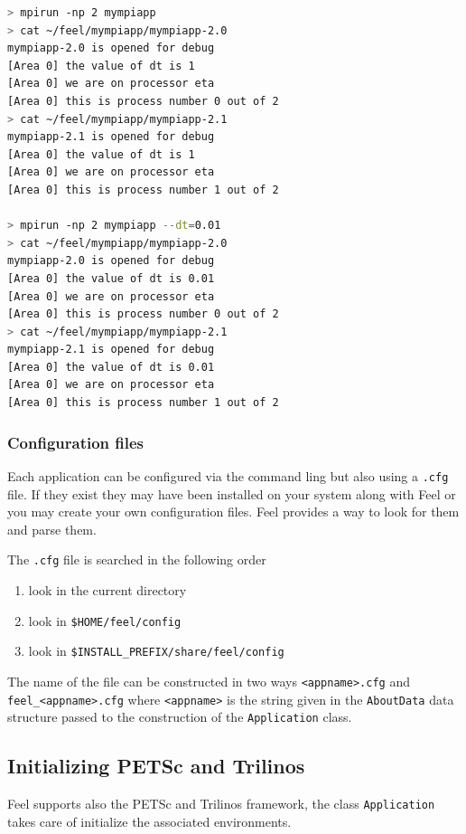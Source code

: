 \documentclass[a4paper]{book}
\newcommand{\feel}{Feel\xspace}
\begin{document}
\begin{lstlisting}[language=sh]
> mpirun -np 2 mympiapp
> cat ~/feel/mympiapp/mympiapp-2.0
mympiapp-2.0 is opened for debug
[Area 0] the value of dt is 1
[Area 0] we are on processor eta
[Area 0] this is process number 0 out of 2
> cat ~/feel/mympiapp/mympiapp-2.1
mympiapp-2.1 is opened for debug
[Area 0] the value of dt is 1
[Area 0] we are on processor eta
[Area 0] this is process number 1 out of 2

> mpirun -np 2 mympiapp --dt=0.01
> cat ~/feel/mympiapp/mympiapp-2.0
mympiapp-2.0 is opened for debug
[Area 0] the value of dt is 0.01
[Area 0] we are on processor eta
[Area 0] this is process number 0 out of 2
> cat ~/feel/mympiapp/mympiapp-2.1
mympiapp-2.1 is opened for debug
[Area 0] the value of dt is 0.01
[Area 0] we are on processor eta
[Area 0] this is process number 1 out of 2
\end{lstlisting}

\subsubsection{Configuration files}


Each application can be configured via the command ling but also using a
\verb|.cfg| file. If they exist they may have been installed on your system
along with \feel or you may create your own configuration files.  \feel provides
a way to look for them and parse them.

The \verb|.cfg| file is searched in the following order
\begin{enumerate}
\item look in the current directory
\item look in \verb|$HOME/feel/config|
\item look in \verb|$INSTALL_PREFIX/share/feel/config|
\end{enumerate}
The name of the file can be constructed in two ways \verb|<appname>.cfg| and
\verb|feel_<appname>.cfg| where \verb|<appname>| is the string given in the
\verb|AboutData| data structure passed to the construction of the
\verb|Application| class.


\subsection{Initializing PETSc and Trilinos}


\feel supports also the PETSc and Trilinos framework, the class
\lstinline!Application! takes care of
initialize the associated environments.
\end{document}
